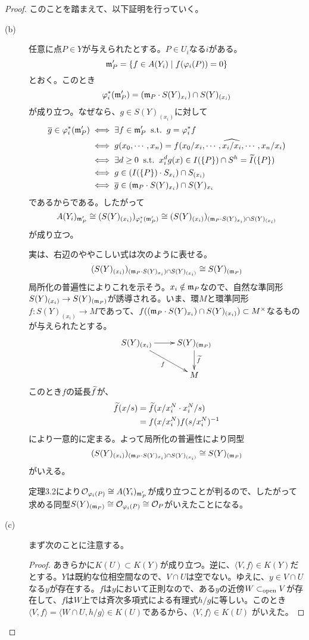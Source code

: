 \begin{proof}
このことを踏まえて、以下証明を行っていく。
\begin{description}
\item[(b)] 任意に点$P \in Y$が与えられたとする。$P \in U_i$なる$i$がある。
\[
\mathfrak{m}'_P = \left\{ f \in A(Y_i) \mathrel{} \middle| \mathrel{} f({\varphi}_i(P))= 0 \right\}
\]
とおく。このとき
\[
{\varphi}^*_i(\mathfrak{m}'_P) = (\mathfrak{m}_P \cdot S(Y)_{x_i}) \cap S(Y)_{(x_i)}
\]
が成り立つ。なぜなら、$g \in S(Y)_{(x_i)}$に対して
\begin{align*}
  \overline{g} \in {\varphi}^*_i(\mathfrak{m}'_P) &\iff \exists f \in \mathfrak{m}'_P \; \; \text{s.t.} \; \; g = {\varphi}^*_i f \\
  &\iff g(x_0, \cdots , x_n ) = f(x_0/x_i, \cdots , \widehat{x_i/x_i} , \cdots , x_n/x_i) \\
  &\iff  \exists d \geq 0 \; \; \text{s.t.} \; \; x_i^d g(x) \in I(\{ P \} ) \cap S^h = \widetilde{I}(\{ P \}) \\
  &\iff g \in (I(\{P\}) \cdot S_{x_i} ) \cap S_{(x_i)} \\
  &\iff \overline{g} \in (\mathfrak{m}_P \cdot S(Y)_{x_i}) \cap S(Y)_{x_i}
\end{align*}
であるからである。したがって
\[
A(Y_i)_{\mathfrak{m}'_P} \cong (S(Y)_{(x_i)})_{{\varphi}^*_i(\mathfrak{m}'_P)} \cong (S(Y)_{(x_i)})_{(\mathfrak{m}_P \cdot S(Y)_{x_i}) \cap S(Y)_{(x_i)}}
\]
が成り立つ。

実は、右辺のややこしい式は次のように表せる。
\[
(S(Y)_{(x_i)})_{(\mathfrak{m}_P \cdot S(Y)_{x_i}) \cap S(Y)_{(x_i)}} \cong S(Y)_{(\mathfrak{m}_P)}
\]
局所化の普遍性によりこれを示そう。$x_i \notin \mathfrak{m}_P$なので、自然な準同形$S(Y)_{(x_i)} \to S(Y)_{(\mathfrak{m}_P)}$が誘導される。いま、環$M$と環準同形$f \colon S(Y)_{(x_i)} \to M$であって、$f((\mathfrak{m}_P \cdot S(Y)_{x_i}) \cap S(Y)_{(x_i)}) \subset M^{\times}$なるものが与えられたとする。
\[
\xymatrix{
S(Y)_{(x_i)} \ar[r] \ar[dr]_f & S(Y)_{(\frakm_P)} \ar[d]^{\wt{f}} \\
{} & M
}
\]
このとき$f$の延長$\widetilde{f}$が、
\begin{align*}
\widetilde{f}(x/s) &= \widetilde{f}(x/x_i^N \cdot x_i^N/s) \\
&= f(x/x_i^N) f(s/x_i^N)^{-1}
\end{align*}
により一意的に定まる。よって局所化の普遍性により同型
\[
(S(Y)_{(x_i)})_{(\mathfrak{m}_P \cdot S(Y)_{x_i}) \cap S(Y)_{(x_i)}} \cong S(Y)_{(\mathfrak{m}_P)}
\]
がいえる。

定理3.2により$\mathcal{O}_{{\varphi}_i(P)} \cong A(Y_i )_{\mathfrak{m}'_P}$が成り立つことが判るので、したがって求める同型$S(Y)_{(\mathfrak{m}_P)} \cong \mathcal{O}_{{\varphi}_i(P)} \cong \mathcal{O}_P$がいえたことになる。

\item[(c)] まず次のことに注意する。
\begin{proof}
  あきらかに$K(U) \subset K(Y)$が成り立つ。逆に、$\langle V, f \rangle \in K(Y)$だとする。$Y$は既約な位相空間なので、$V \cap U$は空でない。ゆえに、$y \in V \cap U$なる$y$が存在する。$f$は$y$において正則なので、ある$y$の近傍$W \subset_{\text{open}} V$が存在して、$f$は$W$上では斉次多項式による有理式$h/g$に等しい。このとき$\langle V, f \rangle  = \langle W \cap U , h/g \rangle \in K(U)$であるから、$\langle V, f \rangle \in K(U)$
  がいえた。
\end{proof}


\end{description}
\end{proof}
